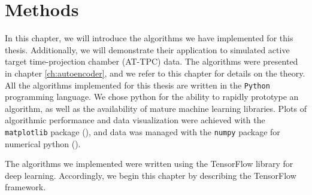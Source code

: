 \chapter{Methods}

In this chapter, we will introduce the algorithms we have implemented for this thesis. Additionally, we will demonstrate their application to simulated active target time-projection chamber (AT-TPC) data. The algorithms were presented in chapter \ref{ch:autoencoder}, and we refer to this chapter for details on the theory. All the algorithms implemented for this thesis are written in the \lstinline{Python} programming language. We chose python for the ability to rapidly prototype an algorithm, as well as the availability of mature machine learning libraries. Plots of algorithmic performance and data visualization were achieved with the \lstinline{matplotlib} package (\cite{matplotlib}), and data was managed with the \lstinline{numpy} package for numerical python (\cite{numpy}).

The algorithms we implemented were written using the TensorFlow library for deep learning. Accordingly, we begin this chapter by describing the TensorFlow framework. 
